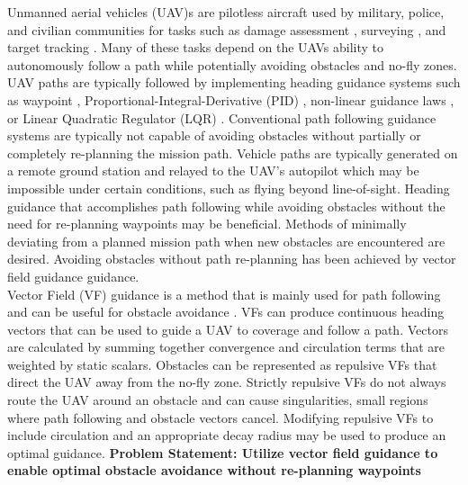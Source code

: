 \documentclass[numbered,pdftex]{ohio-etd}
\begin{document}
Unmanned aerial vehicles (UAV)s are pilotless aircraft used by military, police, and civilian communities for tasks such as damage assessment \cite{fernandez_galarreta_uav-based_2015}, surveying \cite{remondino_uav_2012}, and target tracking \cite{ariyur_autonomous_2008,teuliere_chasing_2011,frew_cooperative_2007,oh_coordinated_2013,hyondong_oh_coordinated_2015,oliveira_moving_2016}. Many of these tasks depend on the UAVs ability to autonomously follow a path while potentially avoiding obstacles and no-fly zones. UAV paths are typically followed by implementing heading guidance systems such as waypoint \cite{osborne_waypoint_2005}, Proportional-Integral-Derivative (PID) \cite{rhee2010tight}, non-linear guidance laws \cite{park2007performance}, or Linear Quadratic Regulator (LQR) \cite{ratnoo_adaptive_2011}. Conventional path following guidance systems are typically not capable of avoiding obstacles without partially or completely re-planning the mission path. Vehicle paths are typically generated on a remote ground station and relayed to the UAV’s autopilot which may be impossible under certain conditions, such as flying beyond line-of-sight. Heading guidance that accomplishes path following while avoiding obstacles without the need for re-planning waypoints may be beneficial. Methods of minimally deviating from a planned mission path when new obstacles are encountered are desired. Avoiding obstacles without path re-planning has been achieved by vector field guidance \cite{frew_cooperative_2007,griffiths_vector_2006,goncalves_artificial_2009,goncalves_circulation_2010,goncalves_vector_2010} guidance.\\

 

Vector Field (VF) guidance is a method that is mainly used for path following \cite{nelson_cooperative_2005,nelson_vector_2006,nelson_vector_2007,griffiths_vector_2006,goncalves_artificial_2009,goncalves_circulation_2010,goncalves_vector_2010} and can be useful for obstacle avoidance \cite{panagou_motion_2014,wilhelm_2019}. VFs can produce continuous heading vectors that can be used to guide a UAV to coverage and follow a path. Vectors are calculated by summing together convergence and circulation terms that are weighted by static scalars. Obstacles can be represented as repulsive VFs that direct the UAV away from the no-fly zone. Strictly repulsive VFs do not always route the UAV around an obstacle and can cause singularities, small regions where path following and obstacle vectors cancel. Modifying repulsive VFs to include circulation and an appropriate decay radius may be used to produce an optimal guidance. \textbf{Problem Statement: Utilize vector field guidance to enable  optimal obstacle avoidance without re-planning waypoints}
 \pagebreak
 
\end{document}
